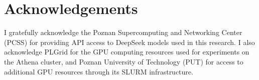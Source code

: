 \chapter*{Acknowledgements}

I gratefully acknowledge the Poznan Supercomputing and Networking Center
(PCSS) for providing API access to DeepSeek models used in this research. I
also acknowledge PLGrid for the GPU computing resources used for experiments on
the Athena cluster, and Poznan University of Technology (PUT) for access to
additional GPU resources through its SLURM infrastructure.
